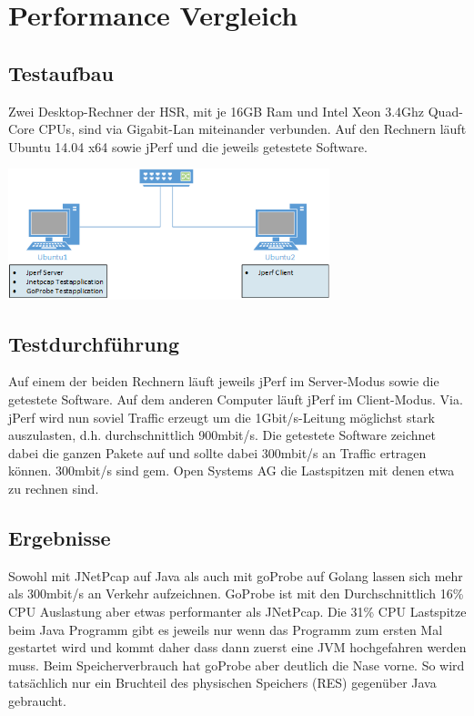 \section{Performance Vergleich}
\label{sec:Performance Vergleich}

\subsection{Testaufbau}
Zwei Desktop-Rechner der HSR, mit je 16GB Ram und Intel Xeon 3.4Ghz Quad-Core CPUs, sind via Gigabit-Lan miteinander verbunden. Auf den Rechnern läuft Ubuntu 14.04 x64 sowie jPerf und die jeweils getestete Software.

\includegraphics[width=0.7\textwidth]{start/img/PerformanceEvaluation.png}

\subsection{Testdurchführung}
Auf einem der beiden Rechnern läuft jeweils jPerf im Server-Modus sowie die getestete Software. Auf dem anderen Computer läuft jPerf im Client-Modus.
Via. jPerf wird nun soviel Traffic erzeugt um die 1Gbit/s-Leitung möglichst stark auszulasten, d.h. durchschnittlich 900mbit/s. Die getestete Software zeichnet dabei die ganzen Pakete auf und sollte dabei 300mbit/s an Traffic ertragen können. 300mbit/s sind gem. Open Systems AG die Lastspitzen mit denen etwa zu rechnen sind.

\subsection{Ergebnisse}
Sowohl mit JNetPcap auf Java als auch mit goProbe auf Golang lassen sich mehr als 300mbit/s an Verkehr aufzeichnen. GoProbe ist mit den Durchschnittlich 16\% CPU Auslastung aber etwas performanter als JNetPcap. Die 31\% CPU Lastspitze beim Java Programm gibt es jeweils nur wenn das Programm zum ersten Mal gestartet wird und kommt daher dass dann zuerst eine \acs{JVM} hochgefahren werden muss.
Beim Speicherverbrauch hat goProbe aber deutlich die Nase vorne. So wird tatsächlich nur ein Bruchteil des physischen Speichers (RES) gegenüber Java gebraucht.

